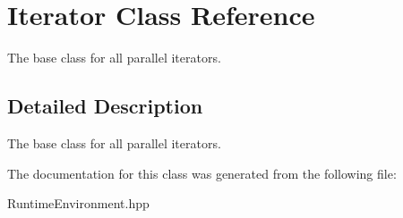 \section{Iterator Class Reference}
\label{classIterator}


The base class for all parallel iterators.  




\subsection{Detailed Description}
The base class for all parallel iterators. 

The documentation for this class was generated from the following file\+:\begin{DoxyCompactItemize}
\item 
Runtime\+Environment.\+hpp\end{DoxyCompactItemize}
